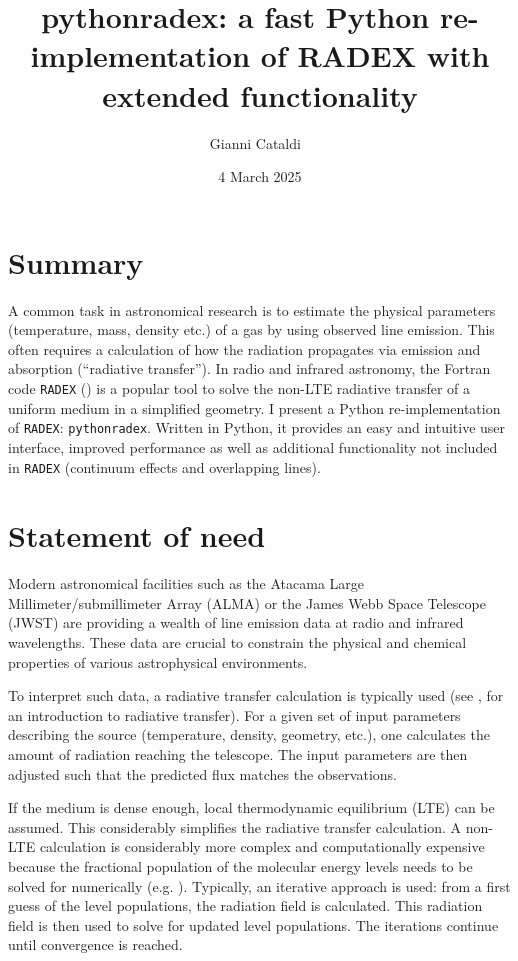\documentclass[
]{article}
\title{pythonradex: a fast Python re-implementation of RADEX with
extended functionality}
\author[1%
  \ensuremath\mathparagraph]{Gianni Cataldi%
    \,\orcidlink{0000-0002-2700-9676}\,%
    }
\affil[1]{National Astronomical Observatory of Japan, 2-21-1 Osawa,
Mitaka, Tokyo 181-8588, Japan%
    \,\protect\href{https://ror.org/052rrw050}{\protect\rorlogo}\,%
  }
\affil[$\mathparagraph$]{Corresponding author: %
}
\date{4 March 2025}
\begin{document}
\maketitle

\section{Summary}\label{summary}

A common task in astronomical research is to estimate the physical
parameters (temperature, mass, density etc.) of a gas by using observed
line emission. This often requires a calculation of how the radiation
propagates via emission and absorption (``radiative transfer''). In
radio and infrared astronomy, the Fortran code \texttt{RADEX}
() is a popular
tool to solve the non-LTE radiative transfer of a uniform medium in a
simplified geometry. I present a Python re-implementation of
\texttt{RADEX}: \texttt{pythonradex}. Written in Python, it provides an
easy and intuitive user interface, improved performance as well as
additional functionality not included in \texttt{RADEX} (continuum
effects and overlapping lines).

\section{Statement of need}\label{statement-of-need}

Modern astronomical facilities such as the Atacama Large
Millimeter/submillimeter Array (ALMA) or the James Webb Space Telescope
(JWST) are providing a wealth of line emission data at radio and
infrared wavelengths. These data are crucial to constrain the physical
and chemical properties of various astrophysical environments.

To interpret such data, a radiative transfer calculation is typically
used (see , for an
introduction to radiative transfer). For a given set of input parameters
describing the source (temperature, density, geometry, etc.), one
calculates the amount of radiation reaching the telescope. The input
parameters are then adjusted such that the predicted flux matches the
observations.

If the medium is dense enough, local thermodynamic equilibrium (LTE) can
be assumed. This considerably simplifies the radiative transfer
calculation. A non-LTE calculation is considerably more complex and
computationally expensive because the fractional population of the
molecular energy levels needs to be solved for numerically (e.g.
). Typically, an
iterative approach is used: from a first guess of the level populations,
the radiation field is calculated. This radiation field is then used to
solve for updated level populations. The iterations continue until
convergence is reached.
\end{document}
